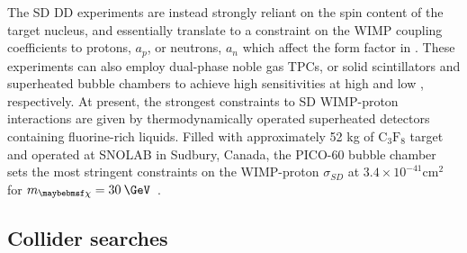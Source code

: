 The SD DD experiments are instead strongly reliant on the spin content of the target nucleus, and essentially translate to a constraint on the WIMP coupling coefficients to protons, $a_p$, or neutrons, $a_n$ which affect the form factor in . These experiments can also employ dual-phase noble gas TPCs, or solid scintillators and superheated bubble chambers to achieve high sensitivities at high and low \mDM, respectively. At present, the strongest constraints to SD WIMP-proton interactions are given by thermodynamically operated superheated detectors containing fluorine-rich liquids. Filled with approximately 52 kg of $\mathrm{C}_3\mathrm{F}_8$ target and operated at SNOLAB in Sudbury, Canada, the PICO-60 bubble chamber sets the most stringent constraints on the WIMP-proton $\sigma_{SD}$ at $3.4\times 10^{-41} \mathrm{cm}^2$ for $\mDM=30\:\GeV$~\cite{Amole:2017dex}.
 
\subsection{Collider searches}
\label{subsec:Collider}

